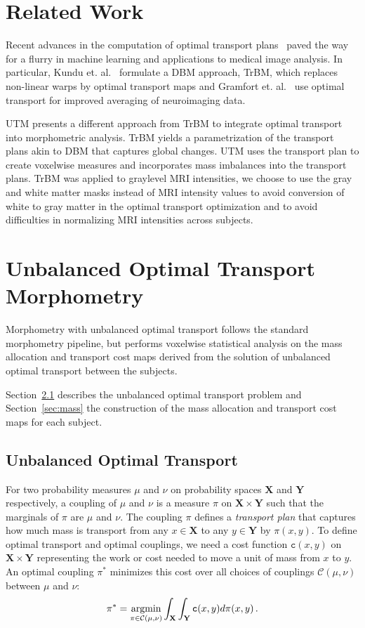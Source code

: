\documentclass{llncs}
\newcommand{\cost}[0]{\mathtt{c}}
\newcommand{\coupling}[0]{\pi}
\def\argmin{\mathop{\rm argmin}}
\newcommand{\Xsp}{{\mathbf{X}}}
\newcommand{\Ysp}{{\mathbf{Y}}}
\begin{document}
\section{Related Work}


Recent advances in the computation of optimal transport
plans~\cite{cuturi2013sinkhorn,gerber2017multiscale} paved the way for a flurry
in machine learning and applications to medical image analysis. In particular,
Kundu et. al.~\cite{kundu2018discovery} formulate a DBM approach, TrBM, which
replaces non-linear warps by optimal transport maps and Gramfort et.
al.~\cite{gramfort2015fast} use optimal transport for improved averaging of
neuroimaging data. 

UTM presents a different approach from TrBM to integrate optimal transport into
morphometric analysis. TrBM yields a parametrization of the transport plans
akin to DBM that captures global changes. UTM uses the transport plan to create
voxelwise measures and incorporates mass imbalances into the transport plans.
TrBM was applied to graylevel MRI intensities, we choose to use the gray and
white matter masks instead of MRI intensity values to avoid conversion of white
to gray matter in the optimal transport optimization and to avoid difficulties
in normalizing MRI intensities across subjects. 



\section{Unbalanced Optimal Transport Morphometry}
\label{sec:methods}
Morphometry with unbalanced optimal transport follows the standard morphometry
pipeline, but performs voxelwise statistical analysis on the mass allocation
and transport cost maps derived from the solution of unbalanced optimal
transport between the subjects.

Section~\ref{sec:unbalanced} describes the unbalanced optimal transport problem
and Section~\ref{sec:mass} the construction of the mass allocation and
transport cost maps for each subject.

\subsection{Unbalanced Optimal Transport}
\label{sec:unbalanced}
For two probability measures $\mu$ and $\nu$ on probability spaces ${\Xsp}$
and ${\Ysp}$ respectively, a coupling of $\mu$ and $\nu$ is a measure
$\coupling$ on ${\Xsp}\times{\Ysp}$ such that the marginals of $\coupling$ are
$\mu$ and $\nu$. The coupling $\coupling$ defines a {\em transport plan} that
captures how much mass is transport from any $x \in \Xsp$ to  any $y \in \Ysp$
by $\coupling(x, y)$. To define optimal transport and optimal couplings, we
need a cost function $\cost(x,y)$ on ${\Xsp}\times{\Ysp}$ representing the work
or cost needed to move a unit of mass from $x$ to $y$. An optimal coupling
$\coupling^*$ minimizes this cost over all choices of couplings
$\mathcal{C}(\mu,\nu)$ between
$\mu$ and $\nu$: 
\begin{equation}
  \coupling^*= \argmin_{\coupling\in\mathcal{C}(\mu,\nu)} \int_{{\Xsp}}\int_{{\Ysp}}
\cost(x,y)  d\coupling(x,y) \,.  
\end{equation}
\end{document}
